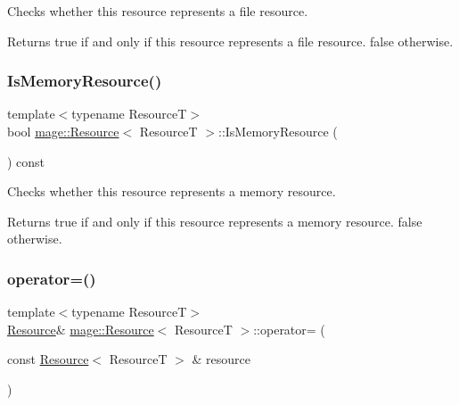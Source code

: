 Checks whether this resource represents a file resource.

\begin{DoxyReturn}{Returns}
{\ttfamily true} if and only if this resource represents a file resource. {\ttfamily false} otherwise. 
\end{DoxyReturn}
\hypertarget{classmage_1_1_resource_af7b0f0c75c9bac9b7b0dc3daec832cbd}{}\label{classmage_1_1_resource_af7b0f0c75c9bac9b7b0dc3daec832cbd} 
\subsubsection{\texorpdfstring{Is\+Memory\+Resource()}{IsMemoryResource()}}
{\footnotesize\ttfamily template$<$typename ResourceT$>$ \\
bool \hyperlink{classmage_1_1_resource}{mage\+::\+Resource}$<$ ResourceT $>$\+::Is\+Memory\+Resource (\begin{DoxyParamCaption}{ }\end{DoxyParamCaption}) const\hspace{0.3cm}{\ttfamily [noexcept]}}

Checks whether this resource represents a memory resource.

\begin{DoxyReturn}{Returns}
{\ttfamily true} if and only if this resource represents a memory resource. {\ttfamily false} otherwise. 
\end{DoxyReturn}
\hypertarget{classmage_1_1_resource_a938159cb02ec565b9b957f993db4769d}{}\label{classmage_1_1_resource_a938159cb02ec565b9b957f993db4769d} 
\subsubsection{\texorpdfstring{operator=()}{operator=()}\hspace{0.1cm}{\footnotesize\ttfamily [1/2]}}
{\footnotesize\ttfamily template$<$typename ResourceT$>$ \\
\hyperlink{classmage_1_1_resource}{Resource}\& \hyperlink{classmage_1_1_resource}{mage\+::\+Resource}$<$ ResourceT $>$\+::operator= (\begin{DoxyParamCaption}\item[{const \hyperlink{classmage_1_1_resource}{Resource}$<$ ResourceT $>$ \&}]{resource }\end{DoxyParamCaption})\hspace{0.3cm}{\ttfamily [delete]}}

